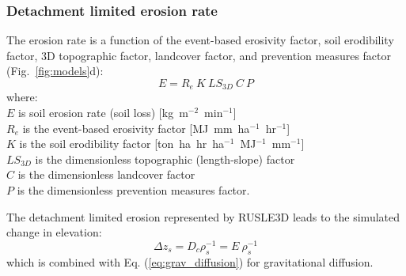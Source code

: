 \documentclass[gmd, manuscript]{copernicus}
\begin{document}

\subsubsection{Detachment limited erosion rate}

The erosion rate is a function of the event-based erosivity factor, 
soil erodibility factor, 3D topographic factor,
landcover factor, and prevention measures factor 
(Fig.~\ref{fig:models}d):
%
\begin{equation}
\label{eq:rusle}
{E = R_e ~ K ~ LS_{3D} ~ C ~ P}
\end{equation}
%
{\small
\noindent
where: \\
\noindent
\hspace*{0.5em} $E$ is soil erosion rate (soil loss) [\unit{kg~m}$^{-2}$~\unit{min}$^{-1}$]\\
\hspace*{0.5em} $R_e$ is the event-based erosivity factor [\unit{MJ~mm~ha}$^{-1}$~\unit{hr}$^{-1}$]\\
\hspace*{0.5em} $K$ is the soil erodibility factor [\unit{ton~ha~hr~ha}$^{-1}$~\unit{MJ}$^{-1}$~\unit{mm}$^{-1}$]\\
\hspace*{0.5em} $LS_{3D}$ is the dimensionless topographic (length-slope) factor\\
\hspace*{0.5em} $C$ is the dimensionless landcover factor\\
\hspace*{0.5em} $P$ is the dimensionless prevention measures factor.\\
}

\noindent
The detachment limited erosion represented by RUSLE3D leads to the simulated change in elevation: 
\begin{equation}
\label{eq:dz_rusle}
{\Delta z_s = D_c \rho_s^{-1} = E ~ \rho_s^{-1}}
\end{equation}
which is combined with Eq. (\ref{eq:grav_diffusion})
for gravitational diffusion.

\end{document}
